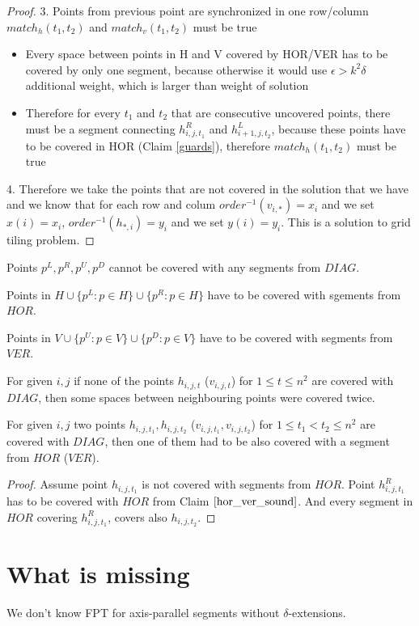 \begin{proof}
3. Points from previous point are synchronized in one row/column
$match_h(t_1,t_2)$ and $match_v(t_1,t_2)$ must be true
\begin{itemize}
\item Every space between points in H and V covered by HOR/VER
has to be covered by only one segment, because otherwise it would
use $\epsilon > k^2\delta$ additional weight, which is larger than
weight of solution
\item Therefore for every $t_1$ and $t_2$ that are consecutive
uncovered points, there must be a segment connecting
$h^R_{i,j,t_1}$ and $h^L_{i+1,j,t_2}$, because these points
have to be covered in HOR (Claim \ref{guards}),
therefore $match_h(t_1,t_2)$ must be true
\end{itemize}

4. Therefore we take the points that are not covered in the solution
that we have and we know that for each row and colum
$order^{-1}(v_{i,*}) = x_i$ and we set $x(i) = x_i$,
$order^{-1}(h_{*,i}) = y_i$ and we set $y(i) = y_i$.
This is a solution to grid tiling problem.

\end{proof}

\begin{claim}
\label{guards}
Points $p^{L}, p^R, p^U, p^D$ cannot be covered with
any segments from $DIAG$.
\end{claim}


\begin{claim}
\label{hor_ver_sound}
Points in $H \cup \{p^L : p \in H\} \cup \{p^R : p \in H\}$
have to be covered with sgements from $HOR$.

Points in $V \cup \{p^U : p \in V\} \cup \{p^D : p \in V\} $
have to be covered with segments from $VER$.
\end{claim}

\begin{claim}
For given $i, j$ if none of the points $h_{i, j, t}$ ($v_{i, j, t}$)
for $1 \le t \le n^2$ are covered with $DIAG$,
then some spaces between neighbouring points were covered twice.
\end{claim}


\begin{claim}
\label{one_diag_in_square}
For given $i, j$ two points $h_{i, j, t_1}, h_{i, j, t_2}$
($v_{i, j, t_1}, v_{i, j, t_2}$)
for $1 \le t_1 < t_2 \le n^2$ are covered with $DIAG$,
then one of them had to be also covered with a segment from $HOR$
($VER$).
\end{claim}
\begin{proof}
Assume point $h_{i, j, t_1}$ is not covered with
segments from $HOR$.
Point $h^R_{i, j, t_1}$ has to be covered with $HOR$
from Claim $\ref{hor_ver_sound}$.
And every segment in $HOR$ covering $h^R_{i, j, t_1}$,
covers also $h_{i, j, t_2}$.
\end{proof}


\section{What is missing}
We don't know FPT for axis-parallel segments without $\delta$-extensions.
